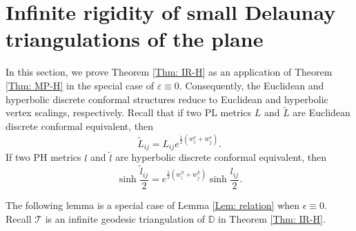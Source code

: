 \documentclass[12pt]{amsart}
\theoremstyle{definition}
\newtheorem{remark}[theorem]{Remark}
\begin{document}

\section{Infinite rigidity of small Delaunay triangulations of the plane}
\label{Sec: IR}

In this section, we prove Theorem \ref{Thm: IR-H} as an application of Theorem \ref{Thm: MP-H} in the special case of  $\varepsilon\equiv0$.
Consequently, the Euclidean and hyperbolic discrete conformal structures reduce to Euclidean and hyperbolic vertex scalings, respectively.
Recall that if two PL metrics $L$ and $\tilde L$ are Euclidean discrete conformal equivalent,
then
\begin{equation}\label{Eq: F20}
\tilde L_{ij}=L_{ij}e^{\frac{1}{2}(w^e_i+w^e_j)}.
\end{equation}
If two PH metrics $l$ and $\tilde l$ are hyperbolic discrete conformal equivalent, then
\begin{equation}\label{Eq: DCE-H2}
\sinh\frac{\tilde l_{ij}}{2}
=e^{\frac{1}{2}(w^h_i+w^h_j)}\sinh \frac{l_{ij}}{2}.
\end{equation}

The following lemma is a special case of Lemma \ref{Lem: relation} when $\epsilon\equiv 0$. Recall $\mathcal{T}$ is an infinite geodesic triangulation of $\mathbb{D}$ in Theorem \ref{Thm: IR-H}.
\end{document}
